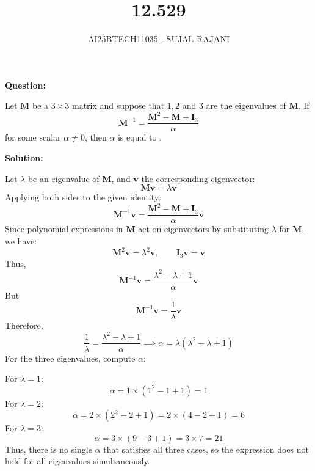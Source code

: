 \documentclass[journal,12pt,onecolumn]{IEEEtran}
\begin{document}
\title{12.529}
\author{AI25BTECH11035 - SUJAL RAJANI}
{\let\newpage\relax\maketitle}



\textbf{Question:}

Let $\mathbf{M}$ be a $3 \times 3$ matrix and suppose that $1, 2$ and $3$ are the eigenvalues of $\mathbf{M}$. If
\[
\mathbf{M}^{-1} = \frac{\mathbf{M}^2 - \mathbf{M} + \mathbf{I}_3}{\alpha}
\]
for some scalar $\alpha \neq 0$, then $\alpha$ is equal to \underline{\qquad}.

\vspace{1cm}

\textbf{Solution:}

Let $\lambda$ be an eigenvalue of $\mathbf{M}$, and $\mathbf{v}$ the corresponding eigenvector: 
\[
\mathbf{M} \mathbf{v} = \lambda \mathbf{v}
\]
Applying both sides to the given identity:
\[
\mathbf{M}^{-1} \mathbf{v} = \frac{\mathbf{M}^2 - \mathbf{M} + \mathbf{I}_3}{\alpha} \mathbf{v}
\]
Since polynomial expressions in $\mathbf{M}$ act on eigenvectors by substituting $\lambda$ for $\mathbf{M}$, we have:
\[
\mathbf{M}^2 \mathbf{v} = \lambda^2 \mathbf{v}, \qquad \mathbf{I}_3 \mathbf{v} = \mathbf{v}
\]
Thus,
\[
\mathbf{M}^{-1} \mathbf{v} = \frac{\lambda^2 - \lambda + 1}{\alpha} \mathbf{v}
\]
But 
\[
\mathbf{M}^{-1} \mathbf{v} = \frac{1}{\lambda} \mathbf{v}
\]
Therefore,
\[
\frac{1}{\lambda} = \frac{\lambda^2 - \lambda + 1}{\alpha}
\implies
\alpha = \lambda (\lambda^2 - \lambda + 1)
\]
For the three eigenvalues, compute $\alpha$:

For $\lambda = 1$:
\[
\alpha = 1 \times (1^2 - 1 + 1) = 1
\]
For $\lambda = 2$:
\[
\alpha = 2 \times (2^2 - 2 + 1) = 2 \times (4 - 2 + 1) = 6
\]
For $\lambda = 3$:
\[
\alpha = 3 \times (9 - 3 + 1) = 3 \times 7 = 21
\]
Thus, there is no single $\alpha$ that satisfies all three cases, so the expression does not hold for all eigenvalues simultaneously.
\end{document}
